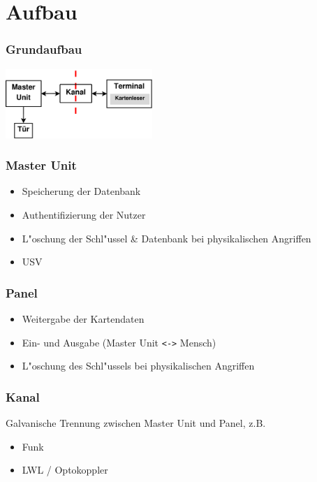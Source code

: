 \section{Aufbau}
\begin{frame}
	\frametitle{Grundaufbau}
	\begin{center}
		\includegraphics[width=210px]{grundaufbau}
	\end{center}
\end{frame}

\begin{frame}
	\frametitle{Master Unit}
	\begin{itemize}
		\item<2-> Speicherung der Datenbank
		\item<3-> Authentifizierung der Nutzer
		\item<4-> L"oschung der Schl"ussel \& Datenbank bei physikalischen Angriffen
		\item<5-> USV
	\end{itemize}
\end{frame}

\begin{frame}
	\frametitle{Panel}
	\begin{itemize}
		\item<2-> Weitergabe der Kartendaten
		\item<3-> Ein- und Ausgabe \small{(Master Unit \texttt{<->} Mensch)}
		\item<4-> L"oschung des Schl"ussels bei physikalischen Angriffen
	\end{itemize}
\end{frame}

\begin{frame}
	\frametitle{Kanal}
	Galvanische Trennung zwischen Master Unit und Panel, z.B.
	\begin{itemize}
		\item Funk
		\item LWL / Optokoppler
	\end{itemize}
\end{frame}
